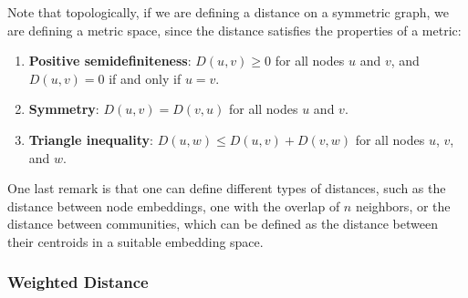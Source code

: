 Note that topologically, if we are defining a distance on a symmetric graph, we are defining a metric space, since the distance satisfies the properties of a metric:
\begin{enumerate}
    \item \textbf{Positive semidefiniteness}: \(D(u,v) \geq 0\) for all nodes \(u\) and \(v\), and \(D(u,v) = 0\) if and only if \(u = v\).
    \item \textbf{Symmetry}: \(D(u,v) = D(v,u)\) for all nodes \(u\) and \(v\).
    \item \textbf{Triangle inequality}: \(D(u,w) \leq D(u,v) + D(v,w)\) for all nodes \(u\), \(v\), and \(w\).
\end{enumerate}

One last remark is that one can define different types of distances, such as the distance between node embeddings, one with the overlap of \(n\) neighbors, or the distance between communities, which can be defined as the distance between their centroids in a suitable embedding space.

\subsubsection{Weighted Distance}

